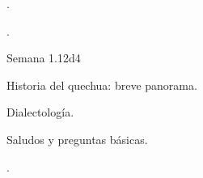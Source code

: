 \begin{syllabus}


\begin{justification}
.
\end{justification}

\begin{goals}
\item .
\end{goals}

\begin{outcomes}

\end{outcomes}

\begin{competences}
    \item {}
    \item {}
    \item {}
    \item {}
\end{competences}

\begin{unit}{Semana 1.}{}{}{12}{d4}
   \begin{topics}
      \item Historia del quechua: breve panorama.
      \item Dialectología.
      \item Saludos y preguntas básicas.
   \end{topics}

   \begin{learningoutcomes}
      \item .
   \end{learningoutcomes}
\end{unit}



\begin{coursebibliography}
\end{coursebibliography}

\end{syllabus}
